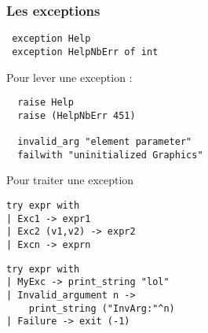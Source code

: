 \begin{frame}[fragile]
	\frametitle{Les exceptions}
	\begin{lstlisting}
 exception Help
 exception HelpNbErr of int
	\end{lstlisting}
	\begin{block}{Pour lever une exception :}
		\begin{lstlisting}
  raise Help
  raise (HelpNbErr 451)
  
  invalid_arg "element parameter"
  failwith "uninitialized Graphics"
		\end{lstlisting}
	\end{block}
	\begin{block}{Pour traiter une exception}
		\begin{center}
			\begin{minipage}{4.2cm}
				\lstset{basicstyle=\scriptsize}
				\begin{lstlisting}
try expr with 
| Exc1 -> expr1
| Exc2 (v1,v2) -> expr2
| Excn -> exprn
				\end{lstlisting}
			\end{minipage}
			\begin{minipage}{5cm}
				\lstset{basicstyle=\scriptsize}
				\begin{lstlisting}
try expr with 
| MyExc -> print_string "lol"
| Invalid_argument n -> 
    print_string ("InvArg:"^n)
| Failure -> exit (-1)
				\end{lstlisting}
			\end{minipage}
		\end{center}
	\end{block}
\end{frame}
